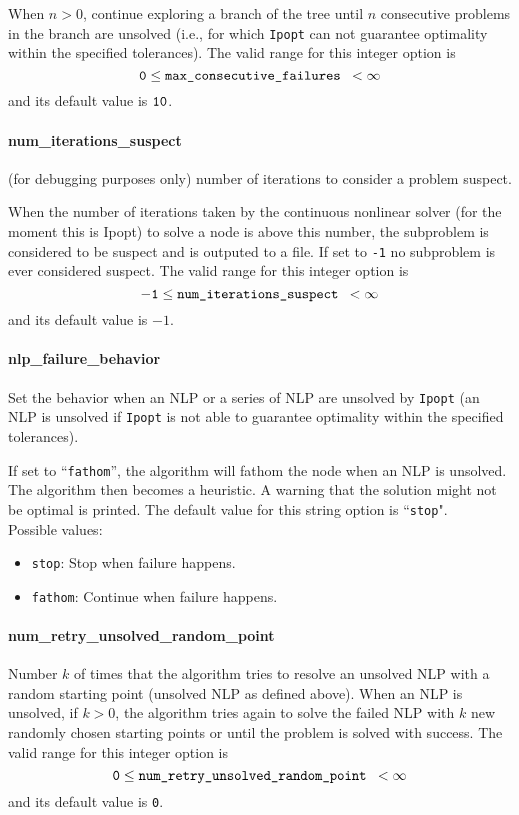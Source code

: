  When $n > 0$, continue exploring a branch of the
tree until $n$ consecutive problems in the branch
are unsolved (i.e., for
which {\tt Ipopt} can not guarantee optimality within
the specified tolerances). The valid range for this integer option is
$${\tt 0} \le \hbox{\tt max\_consecutive\_failures } <  \infty$$
and its default value is ${\tt 10}$.


\paragraph{num\_iterations\_suspect}
\label{num_iterations_suspect}(for debugging purposes only) number of iterations to consider a problem
suspect.

When the number of iterations taken by the continuous nonlinear solver
(for the moment this is Ipopt) to solve a node is above this number,
the subproblem is
considered to be suspect and is outputed
to a file. If set to {\tt -1} no subproblem is ever considered suspect.
The valid range for this integer option is
$${\tt -1} \le \hbox{\tt num\_iterations\_suspect } <  \infty$$
and its default value is $-1$.


\paragraph{nlp\_failure\_behavior}
\label{nlp_failure_behavior}
Set the behavior when an NLP or a series of NLP are unsolved by {\tt Ipopt}
(an NLP is unsolved if {\tt Ipopt} is not able to guarantee optimality within the specified tolerances).

 If set to ``{\tt fathom}'', the algorithm will fathom the
node when an NLP is unsolved. The algorithm then becomes a
heuristic. A warning that the solution might not
be optimal is printed.
The default value for this string option is ``{\tt stop}".
\\
Possible values:
\begin{itemize}
   \item {\tt stop}: Stop when failure happens.
   \item {\tt fathom}: Continue when failure happens.
\end{itemize}

\paragraph{num\_retry\_unsolved\_random\_point}
\label{num_retry_unsolved_random_point}
Number $k$ of times that the algorithm tries to resolve an unsolved NLP with a
random starting point (unsolved NLP as defined above).
 When an NLP is unsolved, if $k > 0$, the algorithm tries
again to solve the failed NLP with $k$ new
randomly chosen starting points  or until the
problem is solved with success. The valid range for this integer option is
$${\tt 0} \le \hbox{\tt num\_retry\_unsolved\_random\_point } <  \infty$$
and its default value is {\tt 0}.



